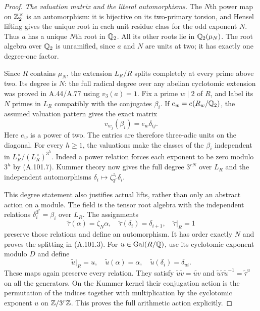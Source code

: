 \begin{proof}
\emph{The valuation matrix and the literal automorphisms.}
The $N$th power map on $\mathbb Z_2^\times$ is an automorphism:
it is bijective on its two-primary torsion, and Hensel
lifting gives the unique root in each unit residue
class for the odd exponent $N$.
Thus $a$ has a unique $N$th root in $\mathbb Q_2$.
All its other roots lie in $\mathbb Q_2(\mu_N)$.
The root algebra over $\mathbb Q_2$ is unramified, since
$a$ and $N$ are units at two; it has exactly one
degree-one factor.

Since $R$ contains $\mu_N$, the extension $L_R/R$
splits completely at every prime above two.
Its degree is $N$: the full radical degree over any
abelian cyclotomic extension was proved in A.44/A.77
using $v_3(a)=1$.
Fix a prime $w\mid2$ of $R$, and label its $N$ primes
in $L_R$ compatibly with the conjugates $\beta_i$.
If $e_w=e(R_w/\mathbb Q_2)$, the assumed valuation pattern
gives the exact matrix
\[
                       v_{w_j}(\beta_i)=e_w\delta_{ij}.
 \tag{A.101.7}
\]
Here $e_w$ is a power of two.
The entries are therefore three-adic units on the
diagonal.  For every $h\ge1$, the valuations make the
classes of the $\beta_i$ independent in
$L_R^\times/(L_R^\times)^{3^h}$.
Indeed a power relation forces each exponent to be
zero modulo $3^h$ by (A.101.7).
Kummer theory now gives the full degree $3^{rN}$
over $L_R$ and the independent automorphisms
$\delta_i\mapsto\zeta_{3^r}^{z_i}\delta_i$.

This degree statement also justifies actual lifts,
rather than only an abstract action on a module.
The field is the tensor root algebra with the independent
relations $\delta_i^{3^r}=\beta_i$ over $L_R$.
The assignments
\[
 \widetilde\tau(\alpha)=\zeta_N\alpha,\quad
 \widetilde\tau(\delta_i)=\delta_{i+1},\quad
 \widetilde\tau|_R=1
 \tag{A.101.8}
\]
preserve those relations and define an automorphism.
It has order exactly $N$ and proves the splitting in
(A.101.3).
For $u\in\operatorname{Gal}(R/\mathbb Q)$, use its cyclotomic
exponent modulo $D$ and define
\[
 \widetilde u|_R=u,\quad \widetilde u(\alpha)=\alpha,
                \quad\widetilde u(\delta_i)=\delta_{ui}.
 \tag{A.101.9}
\]
These maps again preserve every relation.
They satisfy $\widetilde u\widetilde v=\widetilde{uv}$
and $\widetilde u\widetilde\tau\widetilde u^{-1}
=\widetilde\tau^u$ on all the generators.
On the Kummer kernel their conjugation action is
the permutation of the indices together with
multiplication by the cyclotomic exponent $u$
on $\mathbb Z/3^r\mathbb Z$.
This proves the full arithmetic action explicitly.


\end{proof}
